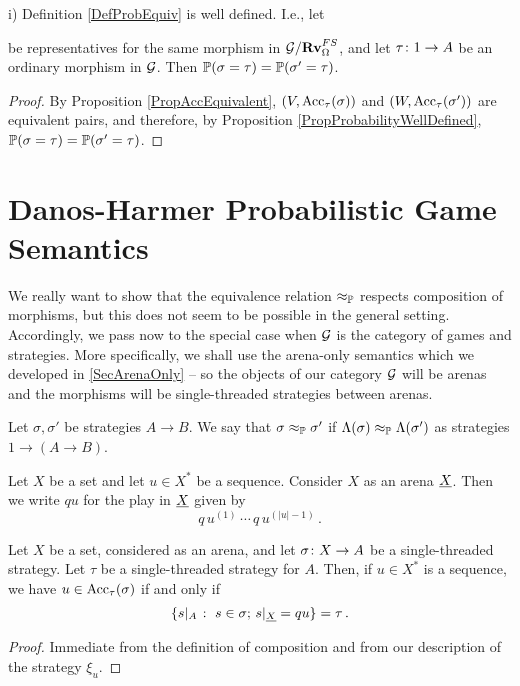 \documentclass{report}[11pt]
\begin{document}
\begin{proposition}
  i) Definition \ref{DefProbEquiv} is well defined.  
  I.e., let
  be representatives for the same morphism in $\mathcal G/{\normalfont\textbf{Rv}}_{\Omega}^{FS}$, and let $\tau \colon 1 \to A$ be an ordinary morphism in $\mathcal G$.  
  Then $\mathbb{P}(\sigma = \tau) = \mathbb{P}(\sigma' = \tau)$.  
\end{proposition}
\begin{proof}
  By Proposition \ref{PropAccEquivalent}, $(V,\operatorname{Acc}_\tau(\sigma))$ and $(W,\operatorname{Acc}_\tau(\sigma'))$ are equivalent pairs, and therefore, by Proposition \ref{PropProbabilityWellDefined}, $\mathbb{P}(\sigma = \tau) = \mathbb{P}(\sigma' = \tau)$.
\end{proof}

\section{Danos-Harmer Probabilistic Game Semantics}

We really want to show that the equivalence relation $\approx_{\mathbb{P}}$ respects composition of morphisms, but this does not seem to be possible in the general setting.  
Accordingly, we pass now to the special case when $\mathcal G$ is the category of games and strategies.  
More specifically, we shall use the arena-only semantics which we developed in \sec\ref{SecArenaOnly} -- so the objects of our category $\mathcal G$ will be arenas and the morphisms will be single-threaded strategies between arenas.

\begin{definition}
  Let $\sigma,\sigma'$ be strategies $A \to B$.  
  We say that $\sigma\approx_{\mathbb{P}}\sigma'$ if $\Lambda(\sigma)\approx_{\mathbb{P}}\Lambda(\sigma')$ as strategies $1 \to (A \to B)$.
\end{definition}

\begin{definition}
  Let $X$ be a set and let $u\in X^*$ be a sequence.  
  Consider $X$ as an arena ${\underline{X}}$.  
  Then we write $qu$ for the play in ${\underline{X}}$ given by
  \[
    q\,u^{(1)}\,\cdots\,q\,u^{(|u|-1)}\,.
    \]
\end{definition}

\begin{proposition}
  Let $X$ be a set, considered as an arena, and let $\sigma \colon X \to A$ be a single-threaded strategy.
  Let $\tau$ be a single-threaded strategy for $A$.  
  Then, if $u\in X^*$ is a sequence, we have $u\in\operatorname{Acc}_\tau(\sigma)$ if and only if
  \[
    \{s\vert_A \;\colon\; s\in\sigma;\,s\vert_{{\underline{X}}} = qu\} = \tau\,.
    \]
\end{proposition}
\begin{proof}
  Immediate from the definition of composition and from our description of the strategy $\xi_u$.
\end{proof}
\end{document}
